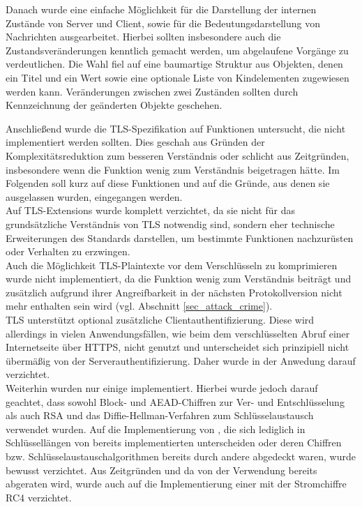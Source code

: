 Danach wurde eine einfache Möglichkeit für die Darstellung der internen Zustände von Server und Client, sowie für die Bedeutungsdarstellung von Nachrichten ausgearbeitet. Hierbei sollten insbesondere auch die Zustandsveränderungen kenntlich gemacht werden, um abgelaufene Vorgänge zu verdeutlichen. Die Wahl fiel auf eine baumartige Struktur aus Objekten, denen ein Titel und ein Wert sowie eine optionale Liste von Kindelementen zugewiesen werden kann. Veränderungen zwischen zwei Zuständen sollten durch Kennzeichnung der geänderten Objekte geschehen. 


Anschließend wurde die TLS-Spezifikation auf Funktionen untersucht, die nicht implementiert werden sollten. Dies geschah aus Gründen der Komplexitätsreduktion zum besseren Verständnis oder schlicht aus Zeitgründen, insbesondere wenn die Funktion wenig zum Verständnis beigetragen hätte. Im Folgenden soll kurz auf diese Funktionen und auf die Gründe, aus denen sie ausgelassen wurden, eingegangen werden.\\
Auf TLS-Extensions wurde komplett verzichtet, da sie nicht für das grundsätzliche Verständnis von TLS notwendig sind, sondern eher technische Erweiterungen des Standards darstellen, um bestimmte Funktionen nachzurüsten oder Verhalten zu erzwingen.\\
Auch die Möglichkeit TLS-Plaintexte vor dem Verschlüsseln zu komprimieren wurde nicht implementiert, da die Funktion wenig zum Verständnis beiträgt und zusätzlich aufgrund ihrer Angreifbarkeit in der nächsten Protokollversion nicht mehr enthalten sein wird (vgl. Abschnitt \ref{sec_attack_crime}).\\
TLS unterstützt optional zusätzliche Clientauthentifizierung. Diese wird allerdings in vielen Anwendungsfällen, wie beim dem verschlüsselten Abruf einer Internetseite über HTTPS, nicht genutzt und unterscheidet sich prinzipiell nicht übermäßig von der Serverauthentifizierung. Daher wurde in der Anwedung darauf verzichtet.\\
Weiterhin wurden nur einige \ciphersuites implementiert. Hierbei wurde jedoch darauf geachtet, dass sowohl Block- und AEAD-Chiffren zur Ver- und Entschlüsselung als auch RSA und das Diffie-Hellman-Verfahren zum Schlüsselaustausch verwendet wurden. Auf die Implementierung von \ciphersuites, die sich lediglich in Schlüssellängen von bereits implementierten \ciphersuites unterscheiden oder deren Chiffren bzw. Schlüsselaustauschalgorithmen bereits durch andere \ciphersuites abgedeckt waren, wurde bewusst verzichtet. Aus Zeitgründen und da von der Verwendung bereits abgeraten wird, wurde auch auf die Implementierung einer \ciphersuite{} mit der Stromchiffre RC4 verzichtet.\\
